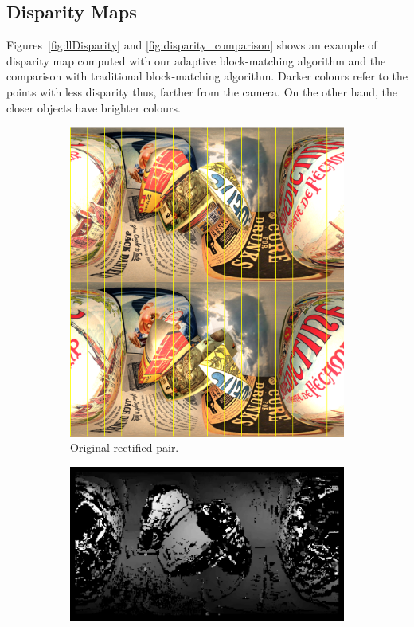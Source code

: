 \subsection{Disparity Maps}
Figures~\ref{fig:llDisparity} and \ref{fig:disparity_comparison}
shows an example of disparity map computed
with our adaptive block-matching algorithm and the comparison with
traditional block-matching algorithm. Darker colours refer to the points
with less disparity thus, farther from the camera. On the other hand, the closer
objects have brighter colours.
%
\begin{figure}[h]
\centering
	\begin{subfigure}{\linewidth}
		\centering
		\includegraphics[width=\linewidth]{img/rectified_pair.png}
		\caption{Original rectified pair.}
	\end{subfigure}
	\begin{subfigure}{\linewidth}
		\centering
		\includegraphics[width=\linewidth]{img/lldisparity2.png}

\end{subfigure}
\end{figure}

